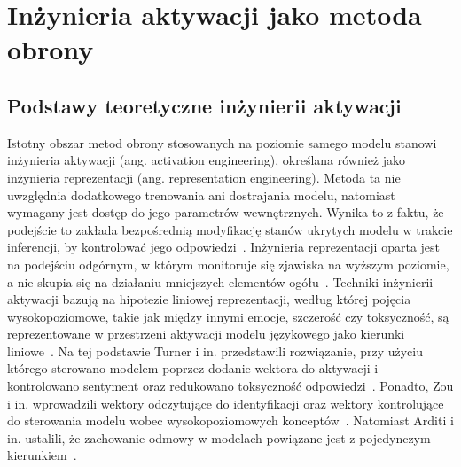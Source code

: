 \section{Inżynieria aktywacji jako metoda obrony}
\subsection{Podstawy teoretyczne inżynierii aktywacji}
Istotny obszar metod obrony stosowanych na poziomie samego modelu stanowi inżynieria aktywacji (ang. activation engineering), określana również jako inżynieria reprezentacji (ang. representation engineering).
Metoda ta nie uwzględnia dodatkowego trenowania ani dostrajania modelu, natomiast wymagany jest dostęp do jego parametrów wewnętrznych. Wynika to z faktu, że podejście to zakłada bezpośrednią modyfikację stanów ukrytych modelu w trakcie inferencji, by kontrolować jego odpowiedzi~\cite{turner2024steeringlanguagemodelsactivation}.
Inżynieria reprezentacji oparta jest na podejściu odgórnym, w którym monitoruje się zjawiska na wyższym poziomie, a nie skupia się na działaniu mniejszych elementów ogółu~\cite{zou2025representationengineeringtopdownapproach}.
Techniki inżynierii aktywacji bazują na hipotezie liniowej reprezentacji, według której pojęcia wysokopoziomowe, takie jak między innymi emocje, szczerość czy toksyczność, są reprezentowane w przestrzeni aktywacji modelu językowego jako kierunki liniowe~\cite{turner2024steeringlanguagemodelsactivation}.
Na tej podstawie Turner i in. przedstawili rozwiązanie, przy użyciu którego sterowano modelem poprzez dodanie wektora do aktywacji i kontrolowano sentyment oraz redukowano toksyczność odpowiedzi~\cite{turner2024steeringlanguagemodelsactivation}.
Ponadto, Zou i in. wprowadzili wektory odczytujące do identyfikacji oraz wektory kontrolujące do sterowania modelu wobec wysokopoziomowych konceptów~\cite{zou2025representationengineeringtopdownapproach}.
Natomiast Arditi i in. ustalili, że zachowanie odmowy w modelach powiązane jest z pojedynczym kierunkiem~\cite{arditi2024refusallanguagemodelsmediated}.

